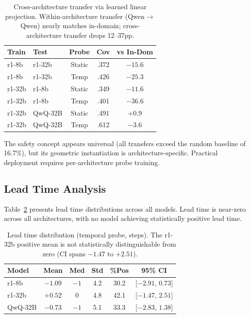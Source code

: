 \documentclass[11pt,a4paper]{article}
\begin{document}
\begin{table}[t]
\centering
\small
\begin{tabular}{llccc}
\toprule
\textbf{Train} & \textbf{Test} & \textbf{Probe} & \textbf{Cov} & \textbf{vs In-Dom} \\
\midrule
r1-8b & r1-32b & Static & .372 & $-15.6$ \\
r1-8b & r1-32b & Temp & .426 & $-25.3$ \\
r1-32b & r1-8b & Static & .349 & $-11.6$ \\
r1-32b & r1-8b & Temp & .401 & $-36.6$ \\
\midrule
r1-32b & QwQ-32B & Static & .491 & $+0.9$ \\
r1-32b & QwQ-32B & Temp & .612 & $-3.6$ \\
\bottomrule
\end{tabular}
\caption{Cross-architecture transfer via learned linear projection. Within-architecture transfer (Qwen$\to$Qwen) nearly matches in-domain; cross-architecture transfer drops 12--37pp.}
\label{tab:transfer}
\end{table}

The safety concept appears universal (all transfers exceed the random baseline of 16.7\%), but its geometric instantiation is architecture-specific. Practical deployment requires per-architecture probe training.

\subsection{Lead Time Analysis}
\label{sec:leadtime}

Table~\ref{tab:leadtime} presents lead time distributions across all models. Lead time is near-zero across all architectures, with no model achieving statistically positive lead time.

\begin{table}[t]
\centering
\small
\begin{tabular}{lccccc}
\toprule
\textbf{Model} & \textbf{Mean} & \textbf{Med} & \textbf{Std} & \textbf{\%Pos} & \textbf{95\% CI} \\
\midrule
r1-8b & $-1.09$ & $-1$ & 4.2 & 30.2 & [$-2.91$, $0.73$] \\
r1-32b & $+0.52$ & 0 & 4.8 & 42.1 & [$-1.47$, $2.51$] \\
QwQ-32B & $-0.73$ & $-1$ & 5.1 & 33.3 & [$-2.83$, $1.38$] \\
\bottomrule
\end{tabular}
\caption{Lead time distribution (temporal probe, steps). The r1-32b positive mean is not statistically distinguishable from zero (CI spans $-1.47$ to $+2.51$).}
\label{tab:leadtime}
\end{table}
\end{document}
